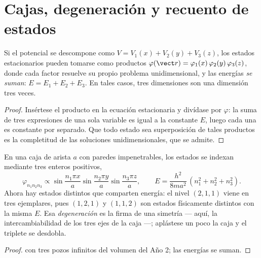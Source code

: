 \section{Cajas, degeneración y recuento de estados}

\begin{theorem}\label{thm:b3:schrodinger-three-dimensions:separation}
Si el potencial se descompone como $V = V_1(x) + V_2(y) + V_3(z)$, los
estados estacionarios pueden tomarse como productos
$\varphi(\vect r) = \varphi_1(x)\,\varphi_2(y)\,\varphi_3(z)$, donde
cada factor resuelve su propio problema unidimensional, y las energías
\emph{se suman}: $E = E_1 + E_2 + E_3$. En tales casos, tres dimensiones
son una dimensión tres veces.
\end{theorem}

\begin{proof}
Insértese el producto en la ecuación estacionaria y divídase por
$\varphi$: la suma de tres expresiones de una sola variable es igual a la
constante $E$, luego cada una es constante por separado. Que todo estado sea
superposición de tales productos es la completitud de las soluciones
unidimensionales, que se admite.
\end{proof}

\begin{proposition}\label{prop:b3:schrodinger-three-dimensions:box}
En una caja de arista $a$ con paredes impenetrables, los estados se indexan
mediante tres enteros positivos,
\[
\varphi_{n_1n_2n_3} \propto
\sin\frac{n_1\pi x}{a}\sin\frac{n_2\pi y}{a}\sin\frac{n_3\pi z}{a} ,
\qquad
E = \frac{h^2}{8ma^2}\,(n_1^2 + n_2^2 + n_3^2) .
\]
Ahora hay estados distintos que comparten energía: el nivel $(2,1,1)$ viene
en tres ejemplares, pues $(1,2,1)$ y $(1,1,2)$ son estados físicamente
distintos con la misma $E$. Esa \emph{degeneración} es la firma de una
simetría --- aquí, la intercambiabilidad de los tres ejes de la caja ---;
aplástese un poco la caja y el triplete se desdobla.
\end{proposition}

\begin{proof}
 con tres pozos infinitos del volumen del Año 2; las
energías se suman.
\end{proof}

